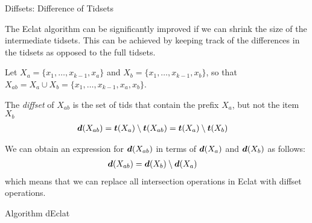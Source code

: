 \begin{frame}{Diffsets: Difference of Tidsets}

The Eclat algorithm can be
signif\/{i}cantly improved if we can shrink the size of the
intermediate tidsets. This can be achieved by keeping track of the
differences in the tidsets as opposed to the full tidsets.

\medskip
Let $X_a = \{x_1, \ldots, x_{k-1}, x_a\}$
and $X_b = \{x_1, \ldots, x_{k-1}, x_b\}$, so that
$X_{ab} = X_a \cup X_b = \{x_1, \ldots, x_{k-1}, x_a,
x_b \}$. 

\medskip
The {\em diffset} of $X_{ab}$ is the set of tids
that contain the pref\/{i}x $X_a$, but not
the item $X_b$
\begin{align*}
  {\boldsymbol d}(X_{ab}) &= {{\boldsymbol t}}(X_{a}) \setminus {{\boldsymbol t}}(X_{ab}) =
    {{\boldsymbol t}}(X_{a}) \setminus {{\boldsymbol t}}(X_{b})
\end{align*}

\medskip
We can obtain an expression for ${\boldsymbol d}(X_{ab})$ in terms of
${\boldsymbol d}(X_a)$ and ${\boldsymbol d}(X_b)$ as follows:
\begin{align*}
  {\boldsymbol d}(X_{ab}) 
    & = {\boldsymbol d}(X_b) \setminus {\boldsymbol d}(X_a)
\end{align*}
which means that we can replace all
intersection operations in Eclat with diffset operations. 

\end{frame}


\begin{frame}[fragile]{Algorithm dEclat}
\begin{tightalgo}[H]{\textwidth-18pt}
\AlgorithmA{}
\end{tightalgo}
\end{frame}


